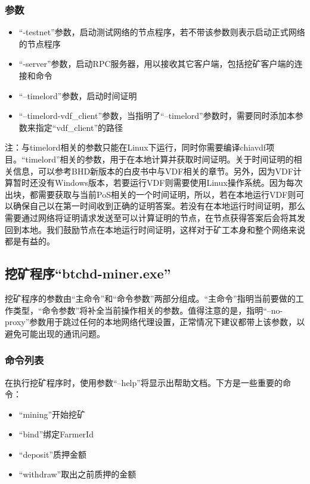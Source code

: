 \subsubsection{参数}
\begin{itemize}
    \item ``-testnet''参数，启动测试网络的节点程序，若不带该参数则表示启动正式网络的节点程序
    \item ``-server''参数，启动RPC服务器，用以接收其它客户端，包括挖矿客户端的连接和命令
    \item ``--timelord''参数，启动时间证明
    \item ``--timelord-vdf\_client''参数，当指明了``--timelord''参数时，需要同时添加本参数来指定``vdf\_client''的路径
\end{itemize}
\begin{flushleft}
    注：与timelord相关的参数只能在Linux下运行，同时你需要编译chiavdf项目。``timelord''相关的参数，用于在本地计算并获取时间证明。关于时间证明的相关信息，可以参考BHD新版本的白皮书中与VDF相关的章节。另外，因为VDF计算暂时还没有Windows版本，若要运行VDF则需要使用Linux操作系统。因为每次出块，都需要获取与当前PoS相关的一个时间证明，所以，若在本地运行VDF则可以确保自己以在第一时间收到正确的证明答案。若没有在本地运行时间证明，那么需要通过网络将证明请求发送至可以计算证明的节点，在节点获得答案后会将其发回到本地。我们鼓励节点在本地运行时间证明，这样对于矿工本身和整个网络来说都是有益的。
\end{flushleft}\subsection{挖矿程序``btchd-miner.exe''}
\begin{flushleft}
    挖矿程序的参数由``主命令''和``命令参数''两部分组成。``主命令''指明当前要做的工作类型，``命令参数''将补全当前操作相关的参数。值得注意的是，指明``--no-proxy''参数用于跳过任何的本地网络代理设置，正常情况下建议都带上该参数，以避免可能出现的通讯问题。
\end{flushleft}
\subsubsection{命令列表}
\begin{flushleft}
    在执行挖矿程序时，使用参数``--help''将显示出帮助文档。下方是一些重要的命令：
\end{flushleft}
\begin{itemize}
    \item ``mining''开始挖矿
    \item ``bind''绑定FarmerId
    \item ``deposit''质押金额
    \item ``withdraw''取出之前质押的金额
\end{itemize}
